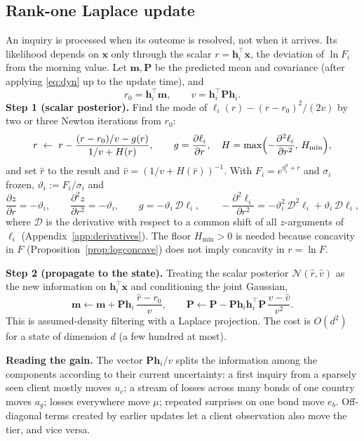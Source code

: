 \documentclass[11pt,a4paper]{article}
\theoremstyle{definition}
\theoremstyle{remark}
\newcommand{\T}{^{\top}}
\newcommand{\bx}{\bm{x}}
\newcommand{\bh}{\bm{h}}
\newcommand{\Pm}{\bm{P}}
\begin{document}
\subsection{Rank-one Laplace update}
An inquiry is processed when its outcome is resolved, not when it arrives. Its likelihood depends on $\bx$ only through the scalar $r=\bh_i\T\bx$, the deviation of $\ln F_i$ from the morning value. Let $\bm m,\Pm$ be the predicted mean and covariance (after applying \eqref{eq:dyn} up to the update time), and
\[
r_0=\bh_i\T\bm m,\qquad v=\bh_i\T\Pm\bh_i .
\]
\textbf{Step 1 (scalar posterior).} Find the mode of $\ell_i(r)-(r-r_0)^2/(2v)$ by two or three Newton iterations from $r_0$:
\begin{equation}\label{eq:newton}
r\;\leftarrow\; r-\frac{(r-r_0)/v-g(r)}{1/v+H(r)},\qquad g=\frac{\partial\ell_i}{\partial r},\quad H=\max\Bigl(-\frac{\partial^2\ell_i}{\partial r^2},\,H_{\min}\Bigr),
\end{equation}
and set $\hat r$ to the result and $\hat v=(1/v+H(\hat r))^{-1}$. With $F_i=e^{\eta^0_i+r}$ and $\sigma_i$ frozen, $\vartheta_i:=F_i/\sigma_i$ and
\begin{equation}\label{eq:chain_r}
\frac{\partial z}{\partial r}=-\vartheta_i,\qquad \frac{\partial^2 z}{\partial r^2}=-\vartheta_i,
\qquad
g=-\vartheta_i\,\mathcal D\ell_i,\qquad -\frac{\partial^2\ell_i}{\partial r^2}=-\vartheta_i^2\,\mathcal D^2\ell_i+\vartheta_i\,\mathcal D\ell_i,
\end{equation}
where $\mathcal D$ is the derivative with respect to a common shift of all $z$-arguments of $\ell_i$ (Appendix~\ref{app:derivatives}). The floor $H_{\min}>0$ is needed because concavity in $F$ (Proposition~\ref{prop:logconcave}) does not imply concavity in $r=\ln F$.

\textbf{Step 2 (propagate to the state).} Treating the scalar posterior $\mathcal N(\hat r,\hat v)$ as the new information on $\bh_i\T\bx$ and conditioning the joint Gaussian,
\begin{equation}\label{eq:update}
\boxed{\;
\bm m\leftarrow\bm m+\Pm\bh_i\,\frac{\hat r-r_0}{v},\qquad
\Pm\leftarrow\Pm-\Pm\bh_i\bh_i\T\Pm\,\frac{v-\hat v}{v^2}.
\;}
\end{equation}
This is assumed-density filtering with a Laplace projection. The cost is $O(d^2)$ for a state of dimension $d$ (a few hundred at most).

\textbf{Reading the gain.} The vector $\Pm\bh_i/v$ splits the information among the components according to their current uncertainty: a first inquiry from a sparsely seen client mostly moves $u_c$; a stream of losses across many bonds of one country moves $a_g$; losses everywhere move $\mu$; repeated surprises on one bond move $e_b$. Off-diagonal terms created by earlier updates let a client observation also move the tier, and vice versa.
\end{document}
